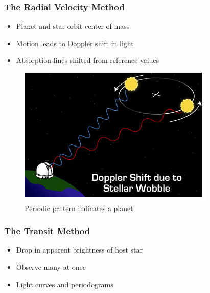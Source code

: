 \begin{frame}
    \frametitle{The Radial Velocity Method}
    \begin{itemize}[<+->]
        \item Planet and star orbit center of mass
        \item Motion leads to Doppler shift in light
        \item Absorption lines shifted from reference values
    \end{itemize}
\end{frame}

\begin{frame}
    \begin{figure}
        \centering
        \includegraphics[height=0.8\textheight]{images/doppler1}
        \caption{Periodic pattern indicates a planet.}
    \end{figure}
\end{frame}

\begin{frame}
    \frametitle{The Transit Method}
    \begin{itemize}[<+->]
        \item Drop in apparent brightness of host star
        \item Observe many at once
        \item Light curves and periodograms
    \end{itemize}
\end{frame}

